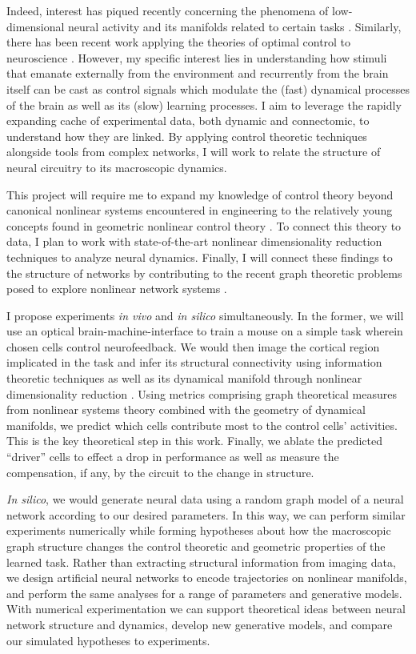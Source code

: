 \documentclass[a4paper,12pt]{article}
\begin{document}

Indeed, interest has piqued recently concerning the phenomena of low-dimensional neural activity and its manifolds related to certain tasks \cite{Gao2015, Gao2017, Sadtler2014}. Similarly, there has been recent work applying the theories of optimal control to neuroscience \cite{Schiff2012}. However, my specific interest lies in understanding how stimuli that emanate externally from the environment and recurrently from the brain itself can be cast as control signals which modulate the (fast) dynamical processes of the brain as well as its (slow) learning processes. I aim to leverage the rapidly expanding cache of experimental data, both dynamic and connectomic, to understand how they are linked. By applying control theoretic techniques alongside tools from complex networks, I will work to relate the structure of neural circuitry to its macroscopic dynamics. 

This project will require me to expand my knowledge of control theory beyond canonical nonlinear systems encountered in engineering to the relatively young concepts found in geometric nonlinear control theory \cite{Brockett2014}. To connect this theory to data, I plan to work with state-of-the-art nonlinear dimensionality reduction techniques to analyze neural dynamics. Finally, I will connect these findings to the structure of networks by contributing to the recent graph theoretic problems posed to explore nonlinear network systems \cite{Tang2017, Zanudo2016}. 


I propose experiments \textit{in vivo} and \textit{in silico} simultaneously. In the former, we will use an optical brain-machine-interface to train a mouse on a simple task wherein chosen cells control neurofeedback. We would then image the cortical region implicated in the task and infer its structural connectivity using information theoretic techniques as well as its dynamical manifold through nonlinear dimensionality reduction \cite{Orlandi2014, Gashler2008}. Using metrics comprising graph theoretical measures from nonlinear systems theory combined with the geometry of dynamical manifolds, we predict which cells contribute most to the control cells' activities. This is the key theoretical step in this work. Finally, we ablate the predicted ``driver'' cells to effect a drop in performance as well as measure the compensation, if any, by the circuit to the change in structure. 

\textit{In silico}, we would generate neural data using a random graph model of a neural network according to our desired parameters. In this way, we can perform similar experiments numerically while forming hypotheses about how the macroscopic graph structure changes the control theoretic and geometric properties of the learned task. Rather than extracting structural information from imaging data, we design artificial neural networks to encode trajectories on nonlinear manifolds, and perform the same analyses for a range of parameters and generative models. With numerical experimentation we can support theoretical ideas between neural network structure and dynamics, develop new generative models, and compare our simulated hypotheses to experiments.   
\end{document}
